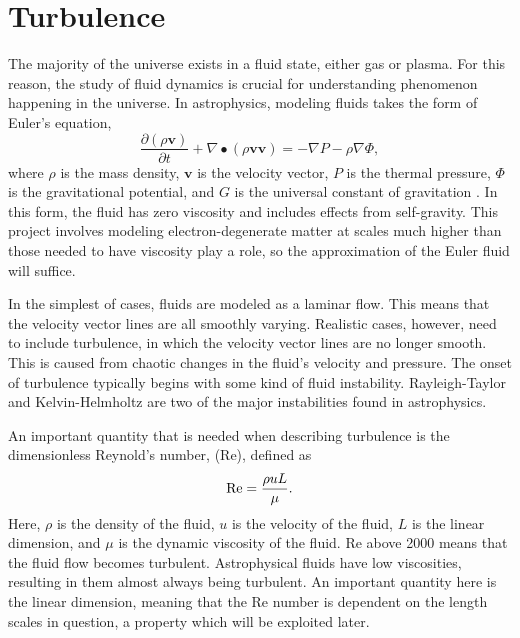 \section{Turbulence}

The majority of the universe exists in a fluid state, either gas or plasma. For this reason, the study of fluid dynamics is crucial for understanding phenomenon happening in the universe. In astrophysics, modeling fluids takes the form of Euler's equation,
\begin{equation*}
	\frac{\partial (\rho \textbf{v})}{\partial t} + \nabla \bullet (\rho \textbf{vv}) = -\nabla P - \rho \nabla \Phi,
\end{equation*}
where $\rho$ is the mass density, $\textbf{v}$ is the velocity vector, $P$ is the thermal pressure, $\Phi$ is the gravitational potential, and $G$ is the universal constant of gravitation \cite{euler}. In this form, the  fluid has zero viscosity and includes effects from self-gravity. This project involves modeling electron-degenerate matter at scales much higher than those needed to have viscosity play a role, so the approximation of the Euler fluid will suffice.

In the simplest of cases, fluids are modeled as a laminar flow. This means that the velocity vector lines are all smoothly varying. Realistic cases, however, need to include turbulence, in which the velocity vector lines are no longer smooth. This is caused from chaotic changes in the fluid's velocity and pressure. The onset of turbulence typically begins with some kind of fluid instability. Rayleigh-Taylor and Kelvin-Helmholtz are two of the major instabilities found in astrophysics.

An important quantity that is needed when describing turbulence is the dimensionless Reynold's number, (Re), defined as
\begin{equation*}
	{\rm Re} = \frac{\rho u L}{\mu}.
\end{equation*}
Here, $\rho$ is the density of the fluid, $u$ is the velocity of the fluid, $L$ is the linear dimension, and $\mu$ is the dynamic viscosity of the fluid. Re above 2000 means that the fluid flow becomes turbulent. Astrophysical fluids have low viscosities, resulting in them almost always being turbulent. An important quantity here is the linear dimension, meaning that the Re number is dependent on the length scales in question, a property which will be exploited later. 

